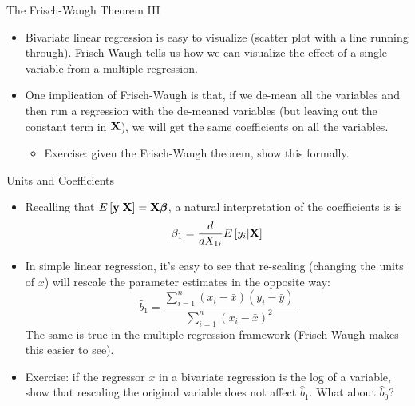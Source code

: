 \begin{frame}{The Frisch-Waugh Theorem III}
\begin{itemize}
	\item Bivariate linear regression is easy to visualize (scatter plot with a line running through).
	Frisch-Waugh tells us how we can visualize the effect of a single variable from a multiple
	regression.

	\medskip
	\item One implication of Frisch-Waugh is that, if we de-mean all the variables and then 
	run a regression with the de-meaned variables (but leaving out the constant term in ${\bf X}$),
	we will get the same coefficients on all the variables.
	\begin{itemize}
		\item Exercise: given the Frisch-Waugh theorem, show this formally. 
	\end{itemize}
\end{itemize}
\end{frame}



\begin{frame}{Units and Coefficients}
\begin{itemize}
	\item Recalling that $E\left[{\bf y}|{\bf X}\right] = {\bf X} \boldsymbol{\beta}$, a natural interpretation	of
	the coefficients is 
	is \[
	\beta_1 = \frac{d }{d X_{1i}}E\left[y_i |{\bf X}\right]
	\]
	
	\item In simple linear regression, it's easy to see that re-scaling (changing the units
	of $x$) will rescale the parameter estimates in the opposite way:\[
		\hat{b}_1 =\frac{\sum\limits_{i=1}^n(x_i-\bar{x})(y_i-\bar{y})}{\sum\limits_{i=1}^n(x_i-\bar{x})^2}
	\]
 	The same is true in the multiple regression framework (Frisch-Waugh makes this easier to see). 

	\medskip
	\item Exercise: if the regressor $x$ in a bivariate regression
	is the log of a variable, show that rescaling the original variable does not
	affect $\hat{b}_1 $. What about $\hat{b}_0$? 
\end{itemize}
\end{frame}




